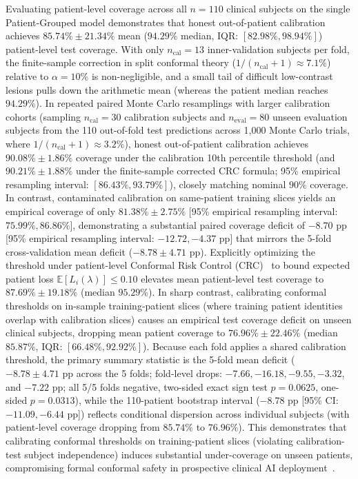 \documentclass[11pt,a4paper]{article}
\begin{document}
Evaluating patient-level coverage across all $n=110$ clinical subjects on the single Patient-Grouped model demonstrates that honest out-of-patient calibration achieves $85.74\% \pm 21.34\%$ mean ($94.29\%$ median, IQR: $[82.98\%, 98.94\%]$) patient-level test coverage. With only $n_{\text{cal}} = 13$ inner-validation subjects per fold, the finite-sample correction in split conformal theory ($1/(n_{\text{cal}}+1) \approx 7.1\%$) relative to $\alpha = 10\%$ is non-negligible, and a small tail of difficult low-contrast lesions pulls down the arithmetic mean (whereas the patient median reaches $94.29\%$). In repeated paired Monte Carlo resamplings with larger calibration cohorts (sampling $n_{\text{cal}} = 30$ calibration subjects and $n_{\text{eval}} = 80$ unseen evaluation subjects from the 110 out-of-fold test predictions across 1,000 Monte Carlo trials, where $1/(n_{\text{cal}}+1) \approx 3.2\%$), honest out-of-patient calibration achieves $90.08\% \pm 1.86\%$ coverage under the calibration 10th percentile threshold (and $90.21\% \pm 1.88\%$ under the finite-sample corrected CRC formula; 95\% empirical resampling interval: $[86.43\%, 93.79\%]$), closely matching nominal $90\%$ coverage. In contrast, contaminated calibration on same-patient training slices yields an empirical coverage of only $81.38\% \pm 2.75\%$ [95\% empirical resampling interval: $75.99\%, 86.86\%$], demonstrating a substantial paired coverage deficit of $-8.70\text{ pp}$ [95\% empirical resampling interval: $-12.72, -4.37\text{ pp}$] that mirrors the 5-fold cross-validation mean deficit ($-8.78 \pm 4.71\text{ pp}$). Explicitly optimizing the threshold under patient-level Conformal Risk Control (CRC)~\cite{angelopoulos2024conformal} to bound expected patient loss $\mathbb{E}[L_i(\lambda)] \le 0.10$ elevates mean patient-level test coverage to $87.69\% \pm 19.18\%$ (median $95.29\%$). In sharp contrast, calibrating conformal thresholds on in-sample training-patient slices (where training patient identities overlap with calibration slices) causes an empirical test coverage deficit on unseen clinical subjects, dropping mean patient coverage to $76.96\% \pm 22.46\%$ (median $85.87\%$, IQR: $[66.48\%, 92.92\%]$). Because each fold applies a shared calibration threshold, the primary summary statistic is the 5-fold mean deficit ($-8.78 \pm 4.71\text{ pp}$ across the 5 folds; fold-level drops: $-7.66, -16.18, -9.55, -3.32$, and $-7.22\text{ pp}$; all 5/5 folds negative, two-sided exact sign test $p = 0.0625$, one-sided $p = 0.0313$), while the 110-patient bootstrap interval ($-8.78\text{ pp}$ [95\% CI: $-11.09, -6.44\text{ pp}$]) reflects conditional dispersion across individual subjects (with patient-level coverage dropping from $85.74\%$ to $76.96\%$). This demonstrates that calibrating conformal thresholds on training-patient slices (violating calibration-test subject independence) induces substantial under-coverage on unseen patients, compromising formal conformal safety in prospective clinical AI deployment~\cite{angelopoulos2024conformal}.
\end{document}
